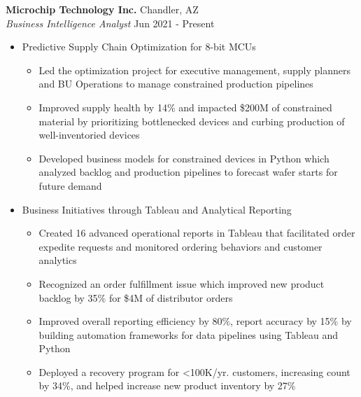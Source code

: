 \documentclass[a4paper]{article}
\begin{document}
\textbf{Microchip Technology Inc.} \hfill Chandler, AZ\\
\textit{Business Intelligence Analyst} \hfill Jun 2021 - Present\\
\vspace{-1mm}
\begin{itemize} \itemsep 1pt
    \item Predictive Supply Chain Optimization for 8-bit MCUs
    \vspace{-1mm}
        \begin{itemize} \itemsep 1pt
        \item Led the optimization project for executive management, supply planners and BU Operations to manage constrained production pipelines
        \item Improved supply health by 14\% and impacted \$200M of constrained material by prioritizing bottlenecked devices and curbing production of well-inventoried devices
        \item Developed business models for constrained devices in Python which analyzed backlog and production pipelines to forecast wafer starts for future demand 
        \end{itemize}
    \item Business Initiatives through Tableau and Analytical Reporting
    \vspace{-1mm}
        \begin{itemize} \itemsep 1pt
        \item Created 16 advanced operational reports in Tableau that facilitated order expedite requests and monitored ordering behaviors and customer analytics
        \item Recognized an order fulfillment issue which improved new product backlog by 35\% for \$4M of distributor orders
        \item Improved overall reporting efficiency by 80\%, report accuracy by 15\% by building automation frameworks for data pipelines using Tableau and Python
        \item Deployed a recovery program for <100K/yr. customers, increasing count by 34\%, and helped increase new product inventory by 27\%


\end{itemize}
\end{itemize}
\end{document}
